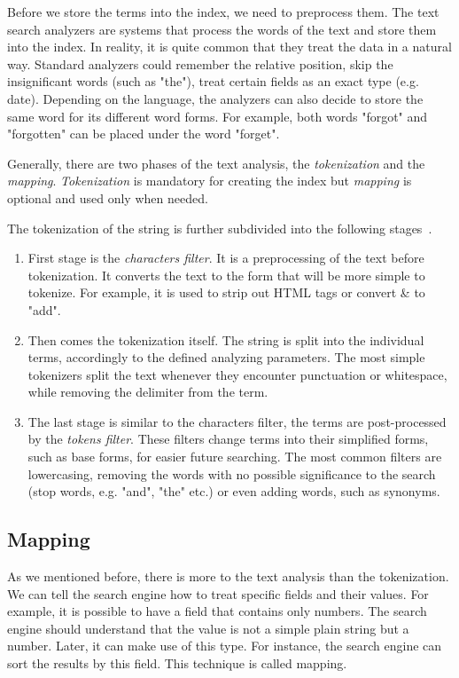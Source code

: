 Before we store the terms into the index, we need to preprocess them.
The text search analyzers are systems that process the words of the text and store them into the index. In reality, it is quite common that they treat the data in a natural way. Standard analyzers could remember the relative position, skip the insignificant words (such as "the"), treat certain fields as an exact type (e.g. date). Depending on the language, the analyzers can also decide to store the same word for its different word forms. For example, both words "forgot" and "forgotten" can be placed under the word "forget".

Generally, there are two phases of the text analysis, the \emph{tokenization} and the \emph{mapping}. \emph{Tokenization} is mandatory for creating the index but \emph{mapping} is optional and used only when needed.

The tokenization of the string is further subdivided into the following stages~\cite{elastic}.
\begin{enumerate}
\item First stage is the \emph{characters filter}. It is a preprocessing of the text before tokenization. It converts the text to the form that will be more simple to tokenize. For example, it is used to strip out HTML tags or convert \& to "add".
\item Then comes the tokenization itself. The string is split into the individual terms, accordingly to the defined analyzing parameters. The most simple tokenizers split the text whenever they encounter punctuation or whitespace, while removing the delimiter from the term.
\item The last stage is similar to the characters filter, the terms are post-processed by the \emph{tokens filter}. These filters change terms into their simplified forms, such as base forms, for easier future searching. The most common filters are lowercasing, removing the words with no possible significance to the search (stop words, e.g. "and", "the" etc.) or even adding words, such as synonyms.
\end{enumerate}

\subsection{Mapping}
As we mentioned before, there is more to the text analysis than the tokenization. We can tell the search engine how to treat specific fields and their values. For example, it is possible to have a field that contains only numbers. The search engine should understand that the value is not a simple plain string but a number. Later, it can make use of this type. For instance, the search engine can sort the results by this field. This technique is called mapping. 

